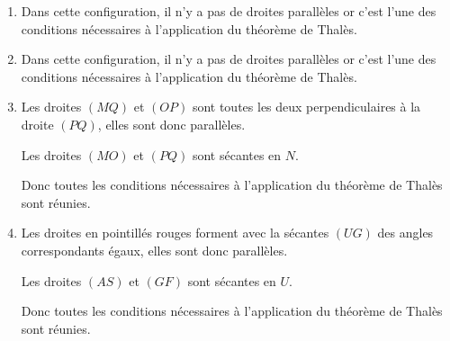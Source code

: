 \begin{corrige}
    \phantom{rrr}    
        \begin{enumerate}
            \item Dans cette configuration, il n'y a pas de droites parallèles or c'est l'une
            des conditions nécessaires à l'application du théorème de Thalès.
            \item Dans cette configuration, il n'y a pas de droites parallèles or c'est l'une
            des conditions nécessaires à l'application du théorème de Thalès.
            \item Les droites $(MQ)$ et $(OP)$ sont toutes les deux perpendiculaires à la droite $(PQ)$, elles sont donc parallèles.
            
            Les droites $(MO)$ et $(PQ)$ sont sécantes en $N$.

            Donc toutes les conditions nécessaires à l'application du théorème de Thalès sont réunies.
            \item Les droites en pointillés rouges forment avec la sécantes $(UG)$ des angles
            correspondants égaux, elles sont donc parallèles.

            Les droites $(AS)$ et $(GF)$ sont sécantes en $U$.

            Donc toutes les conditions nécessaires à l'application du théorème de Thalès sont réunies.
        \end{enumerate}
\end{corrige}

